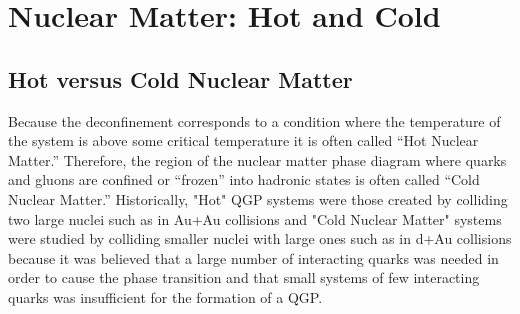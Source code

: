 

\chapter{Nuclear Matter: Hot and Cold} %
\section{Hot versus Cold Nuclear Matter}
Because the deconfinement corresponds to a condition where the temperature of the system is above some critical temperature it is often called ``Hot Nuclear Matter.'' Therefore, the region of the nuclear matter phase diagram where quarks and gluons are confined or ``frozen'' into hadronic states is often called ``Cold Nuclear Matter.'' Historically, "Hot" QGP systems were those created by colliding two large nuclei such as in Au+Au collisions and "Cold Nuclear Matter" systems were studied by colliding smaller nuclei with large ones such as in d+Au collisions because it was believed that a large number of interacting quarks was needed in order to cause the phase transition and that small systems of few interacting quarks was insufficient for the formation of a QGP.

